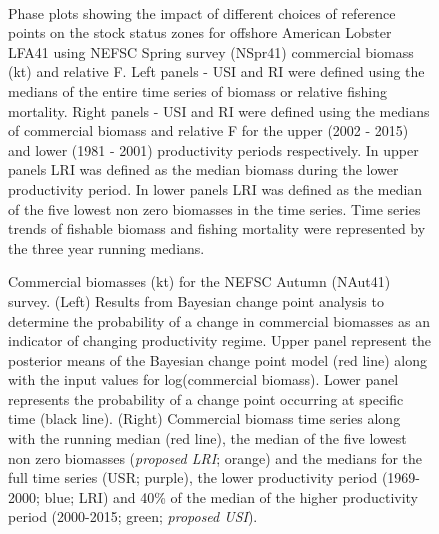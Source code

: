 \documentclass[11pt]{article}
\newcommand{\e}{/backup/bio_data/bio.lobster/figures/} %
\begin{document}
\begin{landscape}
\begin{figure}
\centering
         \\

      \caption{Phase plots showing the impact of different choices of reference points on the stock status zones for offshore American Lobster LFA41 using NEFSC Spring survey (NSpr41) commercial biomass (kt) and relative F. Left panels  - USI and RI were defined using the medians of the entire time series of biomass or relative fishing mortality. Right panels - USI and RI were defined using the medians of commercial biomass and relative F for the upper (2002 - 2015) and lower (1981 - 2001) productivity periods respectively. In upper panels LRI was defined as the median biomass during the lower productivity period. In lower panels LRI was defined as the median of the five lowest non zero biomasses in the time series. Time series trends of fishable biomass and fishing mortality were represented by the three year running medians. }

\end{figure}
\end{landscape}




\begin{landscape}
\begin{figure}
\centering
       \caption{Commercial biomasses (kt) for the NEFSC Autumn (NAut41) survey. (Left) Results from Bayesian change point analysis to determine the probability of a change in commercial biomasses as an indicator of changing productivity regime. Upper panel represent the posterior means of the Bayesian change point model (red line) along with the input values for log(commercial biomass). Lower panel represents the probability of a change point occurring at specific time (black line). (Right) Commercial biomass time series along with the running median (red line), the median of the five lowest non zero biomasses (\emph{proposed LRI}; orange) and the medians for the full time series (USR; purple), the lower productivity period (1969-2000; blue; LRI) and 40\% of the median of the higher productivity period (2000-2015; green; \emph{proposed USI}). }

\end{figure}
\end{landscape}
\end{document}
